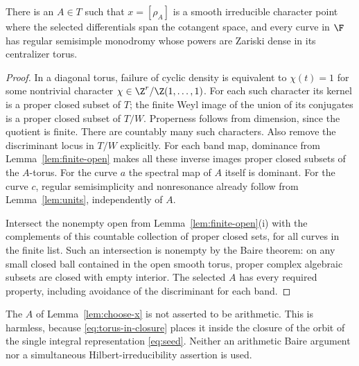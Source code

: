 \begin{lemma}\label{lem:choose-x}
There is an $A\in T$ such that $x=[\rho_A]$ is a smooth irreducible
character point where the selected differentials span the cotangent
space, and every curve in $\F$ has regular semisimple monodromy whose
powers are Zariski dense in its centralizer torus.
\end{lemma}
\begin{proof}
In a diagonal torus, failure of cyclic density is equivalent to
$\chi(t)=1$ for some nontrivial character
$\chi\in\Z^r/\Z(1,\ldots,1)$. For each such character its kernel is a
proper closed subset of $T$; the finite Weyl image of the union of its
conjugates is a proper closed subset of $T/W$. Properness follows from
dimension, since the quotient is finite. There are countably many such
characters. Also remove the discriminant locus in $T/W$ explicitly.
For each band map, dominance from Lemma~\ref{lem:finite-open} makes all
these inverse images proper closed subsets of the $A$-torus. For the
curve $a$ the spectral map of $A$ itself is dominant. For the curve $c$,
regular semisimplicity and nonresonance already follow from
Lemma~\ref{lem:units}, independently of $A$.

Intersect the nonempty open from Lemma~\ref{lem:finite-open}(i) with the
complements of this countable collection of proper closed sets, for all
curves in the finite list. Such an intersection is nonempty by the Baire
theorem: on any small closed ball contained in the open smooth torus,
proper complex algebraic subsets are closed with empty interior. The
selected $A$ has every required property, including avoidance of the
discriminant for each band.
\end{proof}

The $A$ of Lemma~\ref{lem:choose-x} is not asserted to be arithmetic.
This is harmless, because \eqref{eq:torus-in-closure} places it inside
the closure of the orbit of the single integral representation
\eqref{eq:seed}. Neither an arithmetic Baire argument nor a simultaneous
Hilbert-irreducibility assertion is used.
